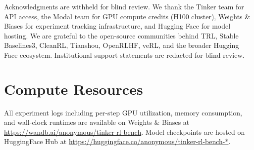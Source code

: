 \documentclass{article}
\begin{document}




\label{sec:acknowledgments}
\begin{ack}
Acknowledgments are withheld for blind review. We thank the Tinker team for
API access, the Modal team for GPU compute credits (H100 cluster), Weights
\& Biases for experiment tracking infrastructure, and Hugging Face for model
hosting. We are grateful to the open-source communities behind TRL, Stable
Baselines3, CleanRL, Tianshou, OpenRLHF, veRL, and the broader Hugging Face
ecosystem. Institutional support statements are redacted for blind review.
\end{ack}





\appendix

\section{Compute Resources}
\label{app:compute}

All experiment logs including per-step GPU utilization, memory consumption,
and wall-clock runtimes are available on Weights \& Biases at
\url{https://wandb.ai/anonymous/tinker-rl-bench}.
Model checkpoints are hosted on HuggingFace Hub at
\url{https://huggingface.co/anonymous/tinker-rl-bench-*}.
\end{document}
